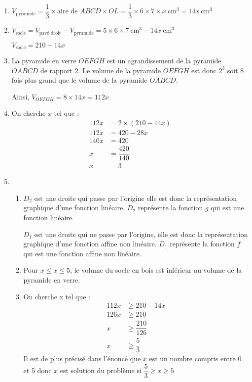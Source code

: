 \begin{enumerate}
\item $V_{\text{pyramide}} = \dfrac{1}{3}\times \text{aire de $ABCD$} \times OL = \dfrac{1}{3}\times 6 \times 7 \times x~\text{cm}^3=14x~\text{cm}^3$
\item $V_{\text{socle}} = V_{\text{pavé droit}} - V_{\text{pyramide}} = 5\times 6\times 7~\text{cm}^3 - 14x~\text{cm}^3$

$V_{\text{socle}} = 210 - 14x$

\item La pyramide en verre $OEFGH$ est un agrandissement de la pyramide $OABCD$ de rapport $2$. Le volume de la pyramide $OEFGH$ est donc $2^3$ soit $8$ fois plus grand que le volume de la pyramide $OABCD$.

Ainsi, $V_{OEFGH}= 8 \times 14x = 112x$

\item On cherche $x$ tel que :
\begin{align*}
112x &=2\times(210-14x)\\
112x &= 420-28x\\
140x &= 420\\
x    &= \dfrac{420}{140}\\
x    &=3
\end{align*} 
\item 
\begin{enumerate}
\item $D_2$ est une droite qui passe par l'origine elle est donc la représentation graphique d’une fonction linéaire. $D_2$ représente la fonction $g$ qui est une fonction linéaire.

$D_1$ est une droite qui ne passe par l'origine, elle est donc la représentation graphique d’une fonction affine non linéaire. $D_1$ représente la fonction $f$ qui est une fonction affine non linéaire.
\item Pour $x\leq x \leq 5$, le volume du socle en bois est inférieur au volume de la pyramide en verre.
\item On cherche x tel que :
\begin{align*}
112x &\geq 210-14x\\
126x &\geq 210\\
x 	 &\geq \dfrac{210}{126}\\
x    &\geq \dfrac{5}{3}
\end{align*} 
Il est de plus précisé dans l'énoncé que $x$ est un nombre compris entre 0 et 5 donc $x$ est solution du problème si 
$\dfrac{5}{3}\geq x \geq 5$
\end{enumerate}
\end{enumerate}

